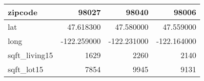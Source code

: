 \begin{table}[H]
\begin{tabular}{|l|r|r|r|}
\hline zipcode & \cellcolor[rgb]{0.9, 0.54, 0.52} 98027 & 98040 & 98006 \\
\hline lat & \cellcolor[rgb]{0.9, 0.54, 0.52} 47.618300 & 47.580000 & 47.559000 \\
\hline long & \cellcolor[rgb]{0.9, 0.54, 0.52} -122.259000 & \cellcolor[rgb]{0.9, 0.54, 0.52} -122.231000 & \cellcolor[rgb]{0.9, 0.54, 0.52} -122.164000 \\
\hline sqft\_living15 & \cellcolor[rgb]{0.9, 0.54, 0.52} 1629 & 2260 & 2140 \\
\hline sqft\_lot15 & \cellcolor[rgb]{0.9, 0.54, 0.52} 7854 & 9945 & 9131 \\
\hline
\end{tabular}
\end{table}
